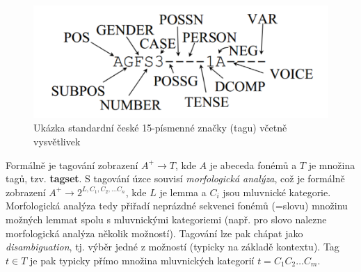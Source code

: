 \documentclass[11pt]{report} %
\numberwithin{equation}{section}
\begin{document}
\begin{figure}[H]
	\centering
	\includegraphics[scale = 1]{img/czechtag.png}
	\caption{Ukázka standardní české 15-písmenné značky (tagu) včetně vysvětlivek}
\end{figure}

Formálně je tagování zobrazení $A^+ \rightarrow T$, kde $A$ je abeceda fonémů a $T$ je množina tagů, tzv. \textbf{tagset}. S tagování úzce souvisí \textit{morfologická analýza}, což je formálně zobrazení $A^+ \rightarrow 2^{L, C_1, C_2, \dots C_n}$, kde $L$ je lemma a $C_i$ jsou mluvnické kategorie. Morfologická analýza tedy přiřadí neprázdné sekvenci fonémů (=slovu) množinu možných lemmat spolu s mluvnickými kategoriemi (např. pro slovo  nalezne morfologická analýza několik možností). Tagování lze pak chápat jako \textit{disambiguation}, tj. výběr jedné z možností (typicky na základě kontextu). Tag $t \in T$ je pak typicky přímo množina mluvnických kategorií $t = C_1C_2\dots C_m$.
\end{document}
